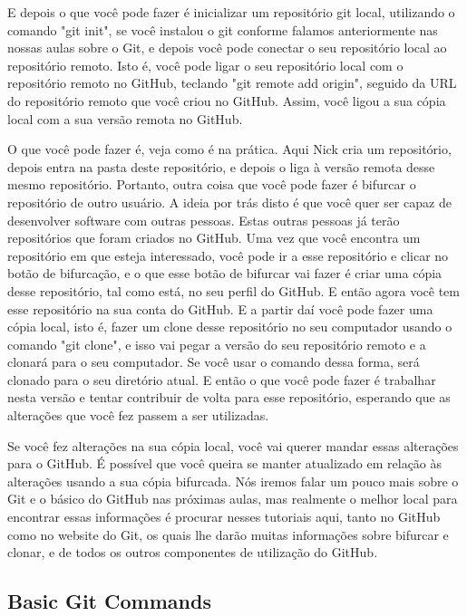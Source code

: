 E depois o que você pode fazer é inicializar um repositório git local, utilizando o comando "git init", se você instalou o git conforme falamos anteriormente nas nossas aulas sobre o Git, e depois você pode conectar o seu repositório local ao repositório remoto. Isto é, você pode ligar o seu repositório local com o repositório remoto no GitHub, teclando "git remote add origin", seguido da URL do repositório remoto que você criou no GitHub. Assim, você ligou a sua cópia local com a sua versão remota no GitHub.  

O que você pode fazer é, veja como é na prática. Aqui Nick cria um repositório, depois entra na pasta deste repositório, e depois o liga à versão remota desse mesmo repositório. Portanto, outra coisa que você pode fazer é bifurcar o repositório de outro usuário. A ideia por trás disto é que você quer ser capaz de desenvolver software com outras pessoas. Estas outras pessoas já terão repositórios que foram criados no GitHub. Uma vez que você encontra um repositório em que esteja interessado, você pode ir a esse repositório e clicar no botão de bifurcação, e o que esse botão de bifurcar vai fazer é criar uma cópia desse repositório, tal como está, no seu perfil do GitHub. E então agora você tem esse repositório na sua conta do GitHub. E a partir daí você pode fazer uma cópia local, isto é, fazer um clone desse repositório no seu computador usando o comando "git clone", e isso vai pegar a versão do seu repositório remoto e a clonará para o seu computador. Se você usar o comando dessa forma, será clonado para o seu diretório atual. E então o que você pode fazer é trabalhar nesta versão e tentar contribuir de volta para esse repositório, esperando que as alterações que você fez passem a ser utilizadas. 

Se você fez alterações na sua cópia local, você vai querer mandar essas alterações para o GitHub. É possível que você queira se manter atualizado em relação às alterações usando a sua cópia bifurcada. Nós iremos falar um pouco mais sobre o Git e o básico do GitHub nas próximas aulas, mas realmente o melhor local para encontrar essas informações é procurar nesses tutoriais aqui, tanto no GitHub como no website do Git, os quais lhe darão muitas informações sobre bifurcar e clonar, e de todos os outros componentes de utilização do GitHub. 


\subsection{Basic Git Commands}

